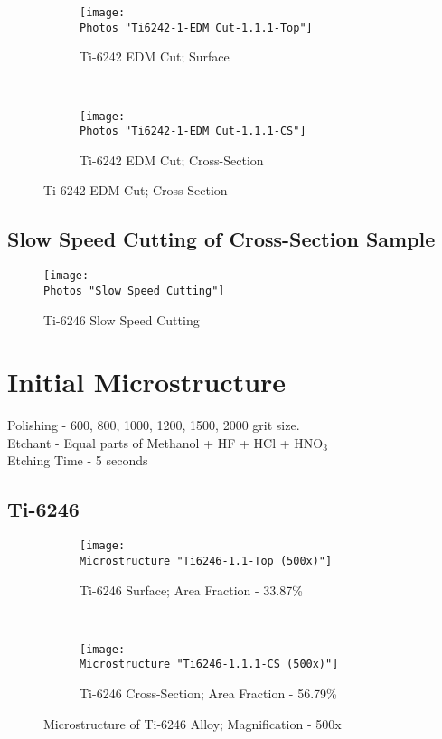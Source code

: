 \begin{figure}[H]
    \centering
    \begin{subfigure}{0.40\textwidth}
        \texttt{[image: \\Photos "Ti6242-1-EDM Cut-1.1.1-Top"]}
        \caption{Ti-6242 EDM Cut; Surface}
        \label{fig:2a}
    \end{subfigure}
    ~
    \begin{subfigure}{0.40\textwidth}
        \texttt{[image: \\Photos "Ti6242-1-EDM Cut-1.1.1-CS"]}
        \caption{Ti-6242 EDM Cut; Cross-Section}
        \label{fig:2b}
    \end{subfigure}
    \label{fig:Ti-6242 EDM Cut; Cross-Section}
\end{figure}

\subsection{Slow Speed Cutting of Cross-Section Sample}

\begin{figure}[H]
    \centering
        \texttt{[image: \\Photos "Slow Speed Cutting"]}
        \caption{Ti-6246 Slow Speed Cutting}
    \label{fig:slow-speed-Cut}
\end{figure}



\section{Initial Microstructure}
Polishing - 600, 800, 1000, 1200, 1500, 2000 grit size. \\
Etchant - Equal parts of Methanol + HF + HCl + HNO$_{3}$ \\
Etching Time - 5 seconds

\subsection{Ti-6246}

\begin{figure}[H]
    \centering
    \begin{subfigure}{0.49\textwidth}
        \texttt{[image: \\Microstructure "Ti6246-1.1-Top (500x)"]}
        \caption{Ti-6246 Surface; Area Fraction - 33.87\%}
        \label{fig:a-As-Received-micro}
    \end{subfigure}
    ~
    \begin{subfigure}{0.49\textwidth}
        \texttt{[image: \\Microstructure "Ti6246-1.1.1-CS (500x)"]}
        \caption{Ti-6246 Cross-Section; Area Fraction - 56.79\%}
        \label{fig:b-As-Received-micro}
    \end{subfigure}
  
    \caption{Microstructure of Ti-6246 Alloy; Magnification - 500x}
    \label{fig:As-Received-micro}
\end{figure}

